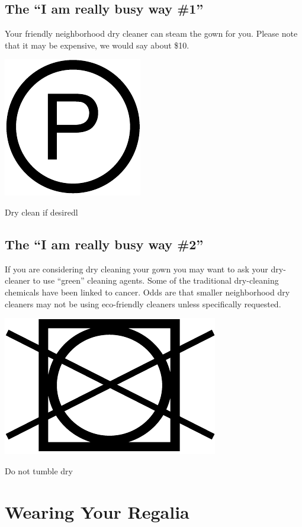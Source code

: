 \documentclass{tufte-handout}
\begin{document}
\subsection{The ``I am really busy way \#1''}
Your friendly neighborhood dry cleaner can steam the gown for you. Please note that it may be expensive, we would say about \$10.

\begin{marginfigure}[-2\baselineskip]%
\hspace*{0.07in}
  \includegraphics[width=.30\linewidth]{dry-clean}
  \caption{Dry clean if desiredl}
  \label{fig:dry-clean}
\end{marginfigure}

\subsection{The ``I am really busy way \#2''}
If you are considering dry cleaning your gown you may want to ask your dry-cleaner to use ``green'' cleaning agents. Some of the traditional dry-cleaning chemicals have been linked to cancer. Odds are that smaller neighborhood dry cleaners may not be using eco-friendly cleaners unless specifically requested.

\begin{marginfigure}[-7\baselineskip]%
\hspace*{0.01in}
  \includegraphics[width=.40\linewidth]{do-not-tumble}
  \caption{Do not tumble dry}
  \label{fig:tumble-dry}
\end{marginfigure}

\newpage
%
%
%
%

\section{Wearing Your Regalia}\label{sec:page-layout}
\end{document}

